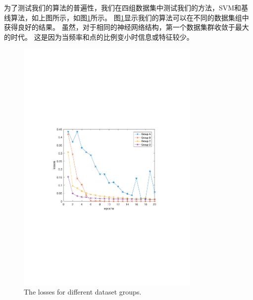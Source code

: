 为了测试我们的算法的普遍性，我们在四组数据集中测试我们的方法，SVM和基线算法，如上图所示，如图\ref{fig:group_results}所示。 图\ref{fig:group_results}显示我们的算法可以在不同的数据集组中获得良好的结果。 虽然，对于相同的神经网络结构，第一个数据集群收敛于最大的时代。 这是因为当频率和点的比例变小时信息或特征较少。
\begin{figure}[!t]
	\centering
	\includegraphics[width=3.5in]{figures/group_results}
	\caption{The losses for different dataset groups.}
	\label{fig:group_results}
\end{figure}

